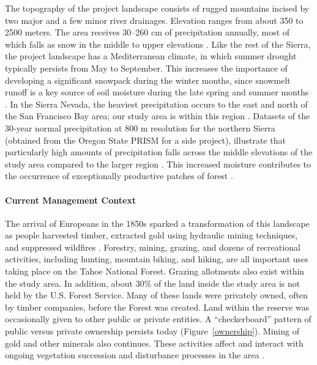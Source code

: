 The topography of the project landscape consists of rugged mountains incised by two major and a few minor river drainages. Elevation ranges from about 350 to 2500 meters. The area receives 30--260 cm of precipitation annually, most of which falls as snow in the middle to upper elevations \citep{Storer1963}. Like the rest of the Sierra, the project landscape has a Mediterranean climate, in which summer drought typically persists from May to September. This increases the importance of developing a significant snowpack during the winter months, since snowmelt runoff is a key source of soil moisture during the late spring and summer months \citep{Minnich2007,Skinner1996}. In the Sierra Nevada, the heaviest precipitation occurs to the east and north of the San Francisco Bay area; our study area is within this region \citep{VanWag2006}. Datasets of the 30-year normal precipitation at 800 m resolution for the northern Sierra (obtained from the Oregon State PRISM for a side project), illustrate that particularly high amounts of precipitation falls across the middle elevations of the study area compared to the larger region \citep{PRISMClimateGroup2004}. This increased moisture contributes to the occurrence of exceptionally productive patches of forest \citep[][ Alan Doerr, personal communication]{Littell2012}.





\paragraph{Current Management Context}

The arrival of Europeans in the 1850s sparked a transformation of this landscape as people harvested timber, extracted gold using hydraulic mining techniques, and suppressed wildfires \citep{Storer1963}. Forestry, mining, grazing, and dozens of recreational activities, including hunting, mountain biking, and hiking, are all important uses taking place on the Tahoe National Forest. Grazing allotments also exist within the study area. In addition, 
about 30\% of the land inside the study area is not held by the U.S. Forest Service. Many of these lands were privately owned, often by timber companies, before the Forest was created. Land within the reserve was occasionally given to other public or private entities. A ``checkerboard'' pattern of public versus private ownership persists today (Figure~\ref{ownership}). Mining of gold and other minerals also continues. These activities affect and interact with ongoing vegetation succession and disturbance processes in the area \citep{USDAForestService2014}.

